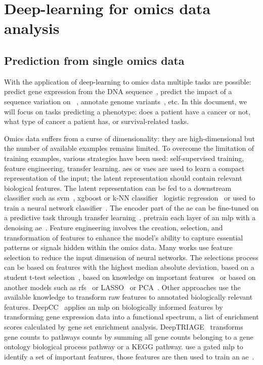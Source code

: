 \documentclass[../main.tex]{subfiles}
\begin{document}
\chapter{Deep-learning for omics data analysis}\label{chap:sota}
\minitocpage

\section{Prediction from single omics data}
 With the application of deep-learning to omics data multiple tasks are possible: predict gene expression from the DNA sequence~\cite{Avsec2021}, predict the impact of a sequence variation on ~\cite{Zeng2017}, annotate genome variants~\cite{Quang2014}, etc\@.
 In this document, we will focus on tasks predicting a phenotype: does a patient have a cancer or not, what type of cancer a patient has, or survival-related tasks.

 Omics data suffers from a curse of dimensionality: they are high-dimensional but the number of available examples remains limited.
 To overcome the limitation of training examples, various strategies have been used: self-supervised training, feature engineering, transfer learning.
 \Glspl{ae} or \glspl{vae} are used to learn a compact representation of the input; the latent representation should contain relevant biological features.
 The latent representation can be fed to a downstream classifier such as \gls{svm}~\cite{Zhang2020}, \gls{xgboost} or k-NN classifier~\cite{Arafa2023} logistic regression~\cite{Wang2018} or used to train a neural network classifier~\cite{Karim2019}.
 The encoder part of the \gls{ae} can be fine-tuned on a predictive task through transfer learning~\cite{Levy2020,Kaczmarek2022}.
 \citeauthor{Hanczar2018} pretrain each layer of an \gls{mlp} with a denoising \gls{ae}~\cite{Hanczar2018}.
 Feature engineering involves the creation, selection, and transformation of features to enhance the model's ability to capture essential patterns or signals hidden within the omics data.
 Many works use feature selection to reduce the input dimension of neural networks.
 The selections process can be based on features with the highest median absolute deviation, based on a student t-test selection~\cite{Liu2019}, based on knowledge on important features~\cite{Kaczmarek2022} or based on another models such as \glspl{rf}~\cite{Wojewodzic2021,Liu2019} or LASSO~\cite{Liu2019} or PCA~\cite{Yu2019}.
 Other approaches use the available knowledge to transform raw features to annotated biologically relevant features.
 DeepCC~\cite{gaoDeepCCNovelDeep2019} applies an \gls{mlp} on biologically informed features by transforming gene expression data into a functional spectrum, \ie{}a list of enrichment scores calculated by gene set enrichment analysis.
 DeepTRIAGE~\cite{beykikhoshkDeepTRIAGEInterpretableIndividualised2020a} transforms gene counts to pathways counts by summing all gene counts belonging to a gene ontology biological process pathway or a KEGG pathway.
 \citeauthor{Zhang2020} use a gated \gls{mlp} to identify a set of important features, those features are then used to train an \gls{ae}~\cite{Zhang2020}.
\end{document}
